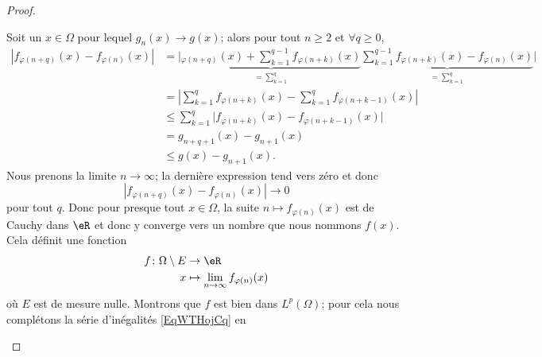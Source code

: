 \begin{proof}
\begin{subproof}
		Soit un \( x\in \Omega\) pour lequel \( g_n(x)\to g(x)\); alors pour tout \( n\geq 2\) et \( \forall q\geq 0\),
		\begin{subequations}    \label{EqWTHojCq}
			\begin{align}
				| f_{\varphi(n+q)}(x)-f_{\varphi(n)}(x) | & =\Big| \underbrace{_{\varphi(n+q)}(x)+\sum_{k=1}^{q-1}f_{\varphi(n+k)}(x)}_{=\sum_{k=1}^q} \underbrace{\sum_{k=1}^{q-1}f_{\varphi(n+k)}(x)-f_{\varphi(n)}(x)}_{=\sum_{k=1}^q} \Big| \\
				                                          & =\left| \sum_{k=1}^qf_{\varphi(n+k)}(x)-\sum_{k=1}^qf_{\varphi(n+k-1)}(x) \right|                                                                                                   \\
				                                          & \leq \sum_{k=1}^q\Big| f_{\varphi(n+k)}(x)-f_{\varphi(n+k-1)}(x) \Big|                                                                                                              \\
				                                          & =g_{n+q+1}(x)-g_{n+1}(x)                                                                                                                                                            \\
				                                          & \leq g(x)-g_{n+1}(x).
			\end{align}
		\end{subequations}
		Nous prenons la limite \( n\to \infty\); la dernière expression tend vers zéro et donc
		\begin{equation}
			| f_{\varphi(n+q)}(x)-f_{\varphi(n)}(x) |\to 0
		\end{equation}
		pour tout \( q\). Donc pour presque tout \( x\in \Omega\), la suite \( n\mapsto f_{\varphi(n)}(x)\) est de Cauchy dans \( \eR\) et donc y converge vers un nombre que nous nommons \( f(x)\). Cela définit une fonction
		\begin{equation}
			\begin{aligned}
				f\colon \Omega\setminus E & \to \eR                                      \\
				x                         & \mapsto \lim_{n\to \infty} f_{\varphi(n)}(x)
			\end{aligned}
		\end{equation}
		où \( E\) est de mesure nulle. Montrons que \( f\) est bien dans \( L^p(\Omega)\); pour cela nous complétons la série d'inégalités \eqref{EqWTHojCq} en
		\begin{equation}

\end{equation}
\end{subproof}
\end{proof}
